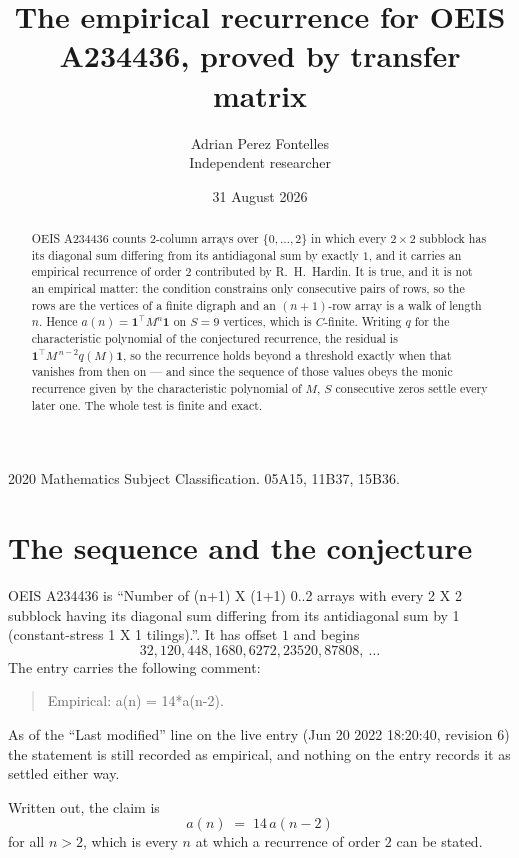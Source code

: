 \documentclass[11pt,a4paper]{article}
\title{The empirical recurrence for OEIS A234436, proved by transfer matrix}
\author{Adrian Perez Fontelles\\ \small Independent researcher}
\date{31 August 2026}
\theoremstyle{plain}
\theoremstyle{definition}
\begin{document}
\maketitle

\begin{abstract}
OEIS A234436 counts $2$-column arrays over $\{0,\dots,2\}$ in which every
$2\times2$ subblock has its diagonal sum differing from its antidiagonal sum by
exactly $1$, and it
carries an empirical recurrence of order $2$ contributed by R.~H.~Hardin. It is true,
and it is not an empirical matter: the condition constrains only consecutive pairs of rows,
so the rows are the vertices of a finite digraph and an $(n+1)$-row array is a walk of
length $n$. Hence $a(n)=\mathbf{1}^{\!\top}M^{n}\mathbf{1}$ on $S=9$ vertices, which
is $C$-finite. Writing $q$ for the characteristic polynomial of the conjectured recurrence,
the residual is $\mathbf{1}^{\!\top}M^{\,n-2}q(M)\mathbf{1}$, so the recurrence
holds beyond a threshold exactly when that vanishes from then on --- and since the sequence
of those values obeys the monic recurrence given by the characteristic polynomial of $M$,
$S$ consecutive zeros settle every later one. The whole test is finite and exact.
\end{abstract}

\noindent\small 2020 Mathematics Subject Classification. 05A15, 11B37, 15B36.\normalsize

\section{The sequence and the conjecture}

OEIS A234436 is ``Number of (n+1) X (1+1) 0..2 arrays with every 2 X 2 subblock having its diagonal sum differing from its antidiagonal sum by 1 (constant-stress 1 X 1 tilings).''. It has offset
$1$ and begins
\[
32, 120, 448, 1680, 6272, 23520, 87808,\ \dots
\]
The entry carries the following comment:
\begin{quote}\small
Empirical: a(n) = 14*a(n-2).
\end{quote}
As of the ``Last modified'' line on the live entry (Jun 20 2022 18:20:40, revision 6) the statement is
still recorded as empirical, and nothing on the entry records it as settled either way.

Written out, the claim is
\begin{equation}\label{eq:conj}
a(n)\;=\;14\,a(n-2)
\end{equation}
for all $n>2$, which is every $n$ at which a recurrence of order $2$ can be
stated.
\end{document}
